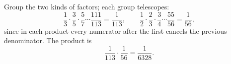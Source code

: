 Group the two kinds of factors; each group telescopes:
\[\dfrac13\cdot\dfrac35\cdot\dfrac57\cdots\dfrac{111}{113}=\dfrac{1}{113},\qquad\dfrac12\cdot\dfrac23\cdot\dfrac34\cdots\dfrac{55}{56}=\dfrac1{56},\]
since in each product every numerator after the first cancels the previous denominator. The product is
\[\dfrac1{113}\cdot\dfrac1{56}=\boxed{\dfrac{1}{6328}}.\]
